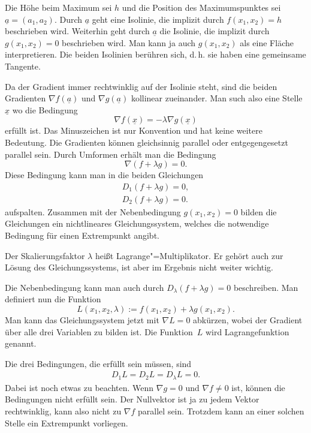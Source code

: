 \documentclass[a4paper,11pt,fleqn,twocolumn,twoside]{scrartcl}
\numberwithin{equation}{section}
\begin{document}
Die Höhe beim Maximum sei $h$ und die Position des Maximumspunktes
sei $\underline a = (a_1,a_2)$. Durch $\underline a$ geht eine
Isolinie, die implizit durch $f(x_1,x_2)=h$ beschrieben wird.
Weiterhin geht durch $\underline a$ die
Isolinie, die implizit durch $g(x_1,x_2)=0$ beschrieben wird.
Man kann ja auch $g(x_1,x_2)$ als eine Fläche interpretieren.
Die beiden Isolinien berühren sich, d.\,h. sie
haben eine gemeinsame Tangente.

Da der Gradient immer rechtwinklig auf der Isolinie steht, sind die
beiden Gradienten $\nabla f(\underline a)$ und
$\nabla g(\underline a)$ kollinear zueinander. Man such also eine
Stelle $\underline x$ wo die Bedingung
\begin{equation}
\nabla f(\underline x) = -\lambda\nabla g(\underline x)
\end{equation}
erfüllt ist. Das Minuszeichen ist nur Konvention und hat keine weitere
Bedeutung. Die Gradienten können
gleichsinnig parallel oder entgegengesetzt parallel sein.
Durch Umformen erhält man die Bedingung
\begin{equation}
\nabla (f+\lambda g)=0.
\end{equation}
Diese Bedingung kann man in die beiden Gleichungen
\begin{gather*}
D_1(f+\lambda g)=0,\\
D_2(f+\lambda g)=0.
\end{gather*}
aufspalten. Zusammen mit der Nebenbedingung $g(x_1,x_2)=0$ bilden
die Gleichungen ein nichtlineares Gleichungssystem, welches die
notwendige Bedingung für einen Extrempunkt angibt.

Der Skalierungsfaktor $\lambda$ heißt Lagrange"=Multiplikator.
Er gehört auch zur Lösung des Gleichungssystems, ist aber
im Ergebnis nicht weiter wichtig.

Die Nebenbedingung kann man auch durch
$D_\lambda (f+\lambda g)=0$ beschreiben.
Man definiert nun die Funktion
\begin{equation}
L(x_1,x_2,\lambda) := f(x_1,x_2)+\lambda g(x_1,x_2).
\end{equation}
Man kann das Gleichungssystem jetzt mit $\nabla L=0$
abkürzen, wobei der Gradient über alle drei Variablen zu bilden ist.
Die Funktion~$L$ wird Lagrangefunktion genannt.

Die drei Bedingungen, die erfüllt sein müssen, sind
\begin{gather*}
D_1 L = D_2 L = D_\lambda L = 0.
\end{gather*}
Dabei ist noch etwas zu beachten. Wenn $\nabla g=0$ und
$\nabla f\ne 0$ ist, können die Bedingungen
nicht erfüllt sein. Der Nullvektor ist ja zu jedem Vektor
rechtwinklig, kann also nicht zu $\nabla f$ parallel sein.
Trotzdem kann an einer solchen Stelle ein Extrempunkt vorliegen.
\end{document}
